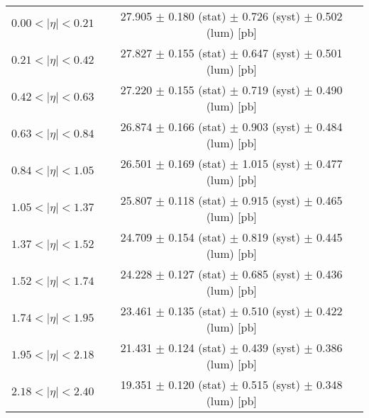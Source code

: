 \begin{tabular}{lc}
\hline
$0.00 < |\eta| <0.21$          & 27.905 $\pm$ 0.180 (stat) $\pm$ 0.726 (syst) $\pm$ 0.502 (lum) [pb]  \\
$0.21 < |\eta| <0.42$          & 27.827 $\pm$ 0.155 (stat) $\pm$ 0.647 (syst) $\pm$ 0.501 (lum) [pb]  \\
$0.42 < |\eta| <0.63$          & 27.220 $\pm$ 0.155 (stat) $\pm$ 0.719 (syst) $\pm$ 0.490 (lum) [pb]  \\
$0.63 < |\eta| <0.84$          & 26.874 $\pm$ 0.166 (stat) $\pm$ 0.903 (syst) $\pm$ 0.484 (lum) [pb]  \\
$0.84 < |\eta| <1.05$          & 26.501 $\pm$ 0.169 (stat) $\pm$ 1.015 (syst) $\pm$ 0.477 (lum) [pb]  \\
$1.05 < |\eta| <1.37$          & 25.807 $\pm$ 0.118 (stat) $\pm$ 0.915 (syst) $\pm$ 0.465 (lum) [pb]  \\
$1.37 < |\eta| <1.52$          & 24.709 $\pm$ 0.154 (stat) $\pm$ 0.819 (syst) $\pm$ 0.445 (lum) [pb]  \\
$1.52 < |\eta| <1.74$          & 24.228 $\pm$ 0.127 (stat) $\pm$ 0.685 (syst) $\pm$ 0.436 (lum) [pb]  \\
$1.74 < |\eta| <1.95$          & 23.461 $\pm$ 0.135 (stat) $\pm$ 0.510 (syst) $\pm$ 0.422 (lum) [pb]  \\
$1.95 < |\eta| <2.18$          & 21.431 $\pm$ 0.124 (stat) $\pm$ 0.439 (syst) $\pm$ 0.386 (lum) [pb]  \\
$2.18 < |\eta| <2.40$          & 19.351 $\pm$ 0.120 (stat) $\pm$ 0.515 (syst) $\pm$ 0.348 (lum) [pb]  \\
\hline
\end{tabular}
